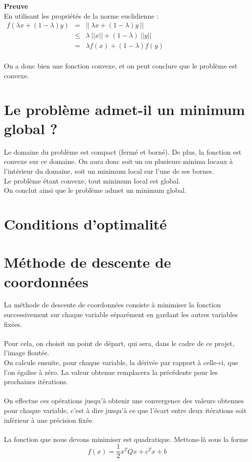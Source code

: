 \documentclass[12pt, a4paper]{report}
\begin{document}
\noindent
\textbf{Preuve}\\
En utilisant les propriétés de la norme euclidienne :\\
$\begin{array}{rcl}
f(\lambda x + (1-\lambda)y) & = & ||\ \lambda x + (1-\lambda)y\ ||\\
 & \leq & \lambda\ ||x|| + (1-\lambda)\ ||y||\\
 & = & \lambda f(x) + (1-\lambda)f(y)\\
\end{array}$

\noindent
\newline
On a donc bien une fonction convexe, et on peut conclure que le problème est convexe.\\


\section{Le problème admet-il un minimum global ?}
Le domaine du problème est compact (fermé et borné). De plus, la fonction est convexe sur ce domaine. On aura donc soit un ou plusieurs minima locaux à l'intérieur du domaine, soit un minimum local sur l'une de ses bornes.\\
Le problème étant convexe, tout minimum local est global.\\
On conclut ainsi que le problème admet un minimum global.\\

\section{Conditions d'optimalité}

\section{Méthode de descente de coordonnées}
La méthode de descente de coordonnées consiste à minimiser la fonction successivement sur chaque variable séparément en gardant les autres variables fixées.\\
\\Pour cela, on choisit un point de départ, qui sera, dans le cadre de ce projet, l'image floutée.\\
On calcule ensuite, pour chaque variable, la dérivée par rapport à celle-ci, que l'on égalise à zéro. La valeur obtenue remplacera la précédente pour les prochaines itérations. \\
\\On effectue ces opérations jusqu'à obtenir une convergence des valeurs obtenues pour chaque variable, c'est à dire jusqu'à ce que l'écart entre deux itérations soit inférieur à une précision fixée. \\
\\La fonction que nous devons minimiser est quadratique. Mettons-là sous la forme \[f(x) = \dfrac{1}{2}x^TQx + c^Tx + b\]
\end{document}
